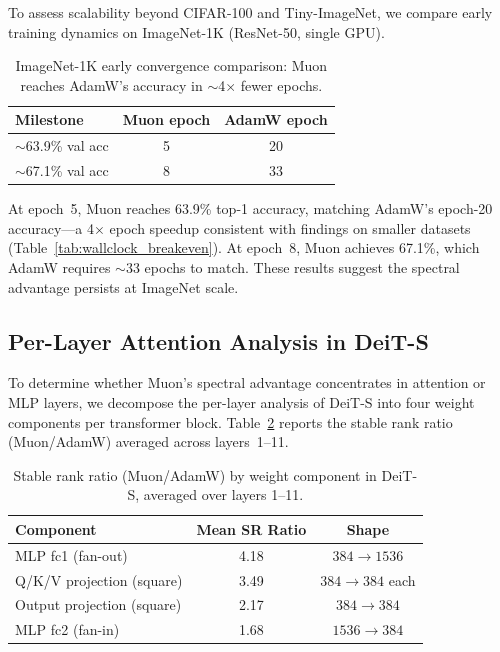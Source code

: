 To assess scalability beyond CIFAR-100 and Tiny-ImageNet, we compare early training dynamics on ImageNet-1K (ResNet-50, single GPU).

\begin{table}[h]
\centering
\caption{ImageNet-1K early convergence comparison: Muon reaches AdamW's accuracy in $\sim$4$\times$ fewer epochs.}
\label{tab:in1k_convergence}
\small
\begin{tabular}{lcc}
\toprule
Milestone & Muon epoch & AdamW epoch \\
\midrule
$\sim$63.9\% val acc & 5 & 20 \\
$\sim$67.1\% val acc & 8 & 33 \\
\bottomrule
\end{tabular}
\end{table}

At epoch~5, Muon reaches 63.9\% top-1 accuracy, matching AdamW's epoch-20 accuracy---a 4$\times$ epoch speedup consistent with findings on smaller datasets (Table~\ref{tab:wallclock_breakeven}). At epoch~8, Muon achieves 67.1\%, which AdamW requires $\sim$33 epochs to match. These results suggest the spectral advantage persists at ImageNet scale.

\subsection{Per-Layer Attention Analysis in DeiT-S}
\label{sec:deit_attention}

To determine whether Muon's spectral advantage concentrates in attention or MLP layers, we decompose the per-layer analysis of DeiT-S into four weight components per transformer block. Table~\ref{tab:sr_by_component} reports the stable rank ratio (Muon/AdamW) averaged across layers~1--11.

\begin{table}[h]
\centering
\caption{Stable rank ratio (Muon/AdamW) by weight component in DeiT-S, averaged over layers 1--11.}
\label{tab:sr_by_component}
\small
\begin{tabular}{lcc}
\toprule
Component & Mean SR Ratio & Shape \\
\midrule
MLP fc1 (fan-out) & 4.18 & $384 \to 1536$ \\
Q/K/V projection (square) & 3.49 & $384 \to 384$ each \\
Output projection (square) & 2.17 & $384 \to 384$ \\
MLP fc2 (fan-in) & 1.68 & $1536 \to 384$ \\
\bottomrule
\end{tabular}
\end{table}

